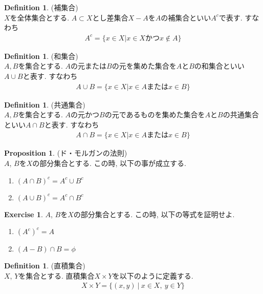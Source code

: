 \documentclass[11pt, a4paper, dvipdfmx]{jsbook}
\theoremstyle{definition}
\newtheorem{Definition+}[Axiom+]{Definition}
\newtheorem{Proposition+}[Axiom+]{Proposition}
\newtheorem{Exercise+}[Axiom+]{Exercise}
\begin{document}
\begin{Definition+}(補集合)\\
  $X$を全体集合とする. $A\subset X$とし差集合$X - A$を$A$の補集合といい$A^{c}$で表す. すなわち
  \begin{align*}
    A^{c} = \{x\in X| x\in X かつx\notin A\}
  \end{align*} 
\end{Definition+}
\begin{Definition+}(和集合)\\
  $A, B$を集合とする. $A$の元または$B$の元を集めた集合を$A$と$B$の和集合といい$A\cup B$と表す. すなわち
  \begin{align*}
    A\cup B = \{x\in X| x\in A またはx\in B\}
  \end{align*}
\end{Definition+}
\begin{Definition+}(共通集合)\\
  $A, B$を集合とする. $A$の元かつ$B$の元であるものを集めた集合を$A$と$B$の共通集合といい$A\cap B$と表す. すなわち
  \begin{align*}
    A\cap B = \{x\in X| x\in A またはx\in B\}
  \end{align*}
\end{Definition+}
\begin{Proposition+}(ド・モルガンの法則)\\
  $A$, $B$を$X$の部分集合とする. この時, 以下の事が成立する.
  \begin{enumerate}
    \item $(A\cap B)^{c} = A^{c}\cup B^{c}$
    \item $(A\cup B)^{c} = A^{c}\cap B^{c}$
  \end{enumerate}
\end{Proposition+}
\begin{Exercise+}
  $A$, $B$を$X$の部分集合とする. この時, 以下の等式を証明せよ.
  \begin{enumerate}
    \item $(A^{c})^{c} = A$
    \item $(A - B)\cap B = \phi$
  \end{enumerate}
\end{Exercise+}
\begin{Definition+}(直積集合)\\
  $X$, $Y$を集合とする. 直積集合$X\times Y$を以下のように定義する.
  \begin{align*}
    X\times Y = \{(x, y)~|~x\in X,~ y\in Y\}
  \end{align*}
\end{Definition+}
\end{document}
